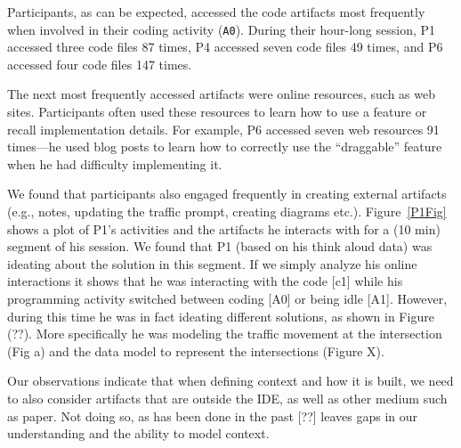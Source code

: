 Participants, as can be expected, accessed the code artifacts most frequently when involved in their coding activity (\texttt{A0}). During their hour-long session, P1 accessed three code files 87 times, P4 accessed seven code files 49 times, and P6 accessed four code files 147 times. 

The next most frequently accessed artifacts were online resources, such as web sites. Participants often used these resources to learn how to use a feature or recall implementation details. For example, P6 accessed seven web resources 91 times---he used blog posts to learn how to correctly use the ``draggable'' feature when he had difficulty implementing it.

We found that participants also engaged frequently in creating external artifacts (e.g., notes, updating the traffic prompt, creating diagrams etc.). Figure~\ref{P1Fig} shows a plot of P1's activities and the artifacts he interacts with for a (10 min) segment of his session. We found that P1 (based on his think aloud data) was ideating about the solution in this segment. If we simply analyze his online interactions it shows that he was interacting with the code [c1] while his programming activity switched between coding [A0] or being idle [A1]. However, during this time he was in fact ideating different solutions, as shown in Figure (??). More specifically he was modeling the traffic movement at the intersection (Fig a) and the data model to represent the  intersections (Figure X).



Our observations indicate that when defining context and how it is built, we need to also consider artifacts that are outside the IDE, as well as other medium such as paper. Not doing so, as has been done in the past [??] leaves gaps in our understanding and the ability to model context.

